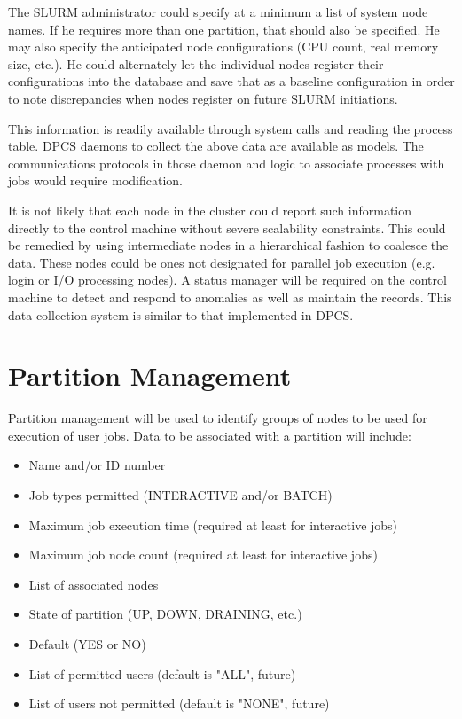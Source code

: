 The SLURM administrator could specify at a minimum a list of system node 
names. If he requires more than one partition, that should also be specified. 
He may also specify the anticipated node configurations (CPU count, real 
memory size, etc.). He could alternately let the individual nodes register 
their configurations into the database and save that as a baseline configuration 
in order to note discrepancies when nodes register on future SLURM initiations.

This information is readily available through system calls and reading the
process table. DPCS daemons to collect the above data are available as models. 
The communications protocols in those daemon and logic to associate processes 
with jobs would require modification.

It is not likely that each node in the cluster could report such information
directly to the control machine without severe scalability constraints. This
could be remedied by using intermediate nodes in a hierarchical fashion to
coalesce the data. These nodes could be ones not designated for parallel job
execution (e.g. login or I/O processing nodes). A status manager will be
required on the control machine to detect and respond to anomalies as well as
maintain the records. This data collection system is similar to that
implemented in DPCS. 

\section{Partition Management}

Partition management will be used to identify groups of nodes to be used for
execution of user jobs. Data to be associated with a partition will include:
\begin{itemize}
\item Name and/or ID number
\item Job types permitted (INTERACTIVE and/or BATCH)
\item Maximum job execution time (required at least for interactive jobs)
\item Maximum job node count (required at least for interactive jobs)
\item List of associated nodes
\item State of partition (UP, DOWN, DRAINING, etc.)
\item Default (YES or NO)
\item List of permitted users (default is "ALL", future)
\item List of users not permitted (default is "NONE", future)
\end{itemize}

